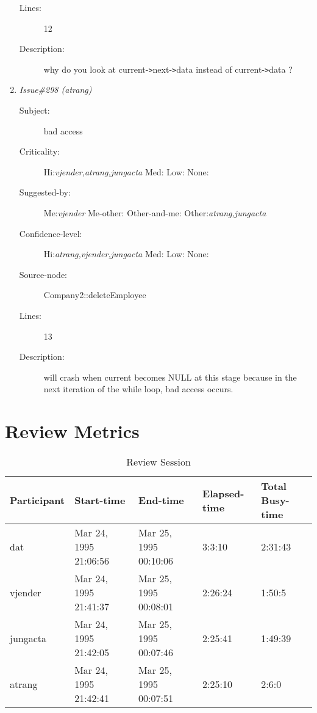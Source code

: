 \begin{enumerate}
\begin{description}
\item [Lines:] 12

\item [Description:] why do you look at current-{\tt >}next-{\tt >}data instead of current-{\tt >}data ?
\end{description}
\item {\it Issue\#298 (atrang)}
\begin{description}
\item [Subject:] bad access
\item [Criticality:] Hi:{\it vjender,atrang,jungacta} Med:{\it } Low:{\it } None:{\it }
\item [Suggested-by:] Me:{\it vjender} Me-other:{\it } Other-and-me:{\it } Other:{\it atrang,jungacta}
\item [Confidence-level:] Hi:{\it atrang,vjender,jungacta} Med:{\it } Low:{\it } None:{\it }
\item [Source-node:] Company2::deleteEmployee

\item [Lines:] 13

\item [Description:] will crash when current becomes NULL at this stage because in the next
iteration of the while loop, bad access occurs.
\end{description}
\end{enumerate}
\section{Review Metrics}
\begin{table}[hb]
\begin{center}
\begin{tabular}{|l|l|l|l|l|}
\hline
Participant & Start-time & End-time & Elapsed-time & Total Busy-time \\
\hline
dat & Mar 24, 1995 21:06:56 & Mar 25, 1995 00:10:06 & 3:3:10 & 2:31:43 \\
vjender & Mar 24, 1995 21:41:37 & Mar 25, 1995 00:08:01 & 2:26:24 & 1:50:5 \\
jungacta & Mar 24, 1995 21:42:05 & Mar 25, 1995 00:07:46 & 2:25:41 & 1:49:39 \\
atrang & Mar 24, 1995 21:42:41 & Mar 25, 1995 00:07:51 & 2:25:10 & 2:6:0 \\
\hline
\end{tabular}
\end{center}
\caption{Review Session}
\end{table}


